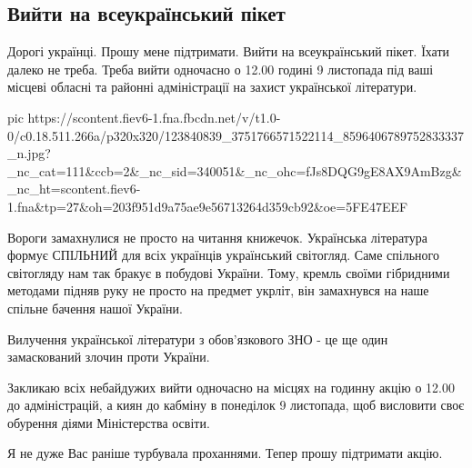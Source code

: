  
 
 
 
 
 
\subsection{Вийти на всеукраїнський пікет}
\label{sec:03_11_2020.fb.nitsoi_larysa.1.piket}

Дорогі українці. Прошу мене підтримати. Вийти на всеукраїнський пікет. Їхати
далеко не треба. Треба вийти одночасно о 12.00 годині 9 листопада під ваші
місцеві обласні та районні адміністрації на захист української літератури. 

\ifcmt
pic https://scontent.fiev6-1.fna.fbcdn.net/v/t1.0-0/c0.18.511.266a/p320x320/123840839_3751766571522114_8596406789752833337_n.jpg?_nc_cat=111&ccb=2&_nc_sid=340051&_nc_ohc=fJs8DQG9gE8AX9AmBzg&_nc_ht=scontent.fiev6-1.fna&tp=27&oh=203f951d9a75ae9e56713264d359cb92&oe=5FE47EEF
\fi

Вороги замахнулися не просто на читання книжечок. Українська література формує
СПІЛЬНИЙ для всіх українців український світогляд. Саме спільного світогляду
нам так бракує в побудові України. Тому, кремль своїми гібридними методами
підняв руку не просто на предмет укрліт, він замахнувся на наше спільне бачення
нашої України. 

Вилучення української літератури з обов'язкового ЗНО - це ще один замаскований
злочин проти України. 

Закликаю всіх небайдужих вийти одночасно на місцях на годинну акцію о 12.00 до
адміністрацій, а киян до кабміну в понеділок 9 листопада, щоб висловити своє
обурення діями Міністерства освіти. 

Я не дуже Вас раніше турбувала проханнями. Тепер прошу підтримати акцію.
